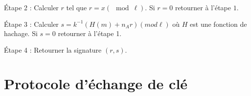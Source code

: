     \quad Étape 2 : Calculer $r$ tel que $r = x (\mod \ell)$. Si $r = 0$ retourner à l'étape
    $1$.

    \quad Étape 3 : Calculer $s = k^{-1} ( H(m) + n_{A}r) (mod \ell)$ où $H$ est une fonction
    de hachage. Si $s= 0$ retourner à l'étape 1.

    \quad Étape 4 : Retourner la signature $(r,s)$.

    \quad

    \quad

    \quad

    \quad

    \quad

    \quad

\section{Protocole d'échange de clé}






